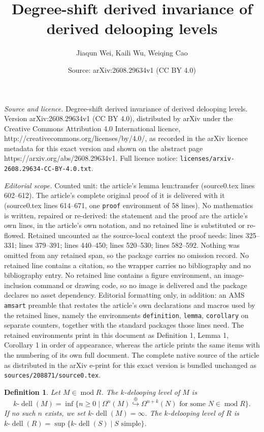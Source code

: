 \documentclass[10pt,a4paper]{amsart}
\title{Degree-shift derived invariance of derived delooping levels}
\author{Jiaqun Wei, Kaili Wu, Weiqing Cao}
\date{Source: arXiv:2608.29634v1 (CC BY 4.0)}
\newtheorem{definition}{Definition}
\DeclareMathOperator{\dell}{dell}
\DeclareMathOperator{\modd}{mod}
\newcommand{\oemb}{\stackrel{\oplus}{\hookrightarrow}}
\begin{document}
\maketitle

\noindent\emph{Source and licence.} Degree-shift derived invariance of derived delooping levels. Version arXiv:2608.29634v1 (CC BY 4.0), distributed by arXiv under the Creative Commons Attribution 4.0 International licence, http://creativecommons.org/licenses/by/4.0/, as recorded in the arXiv licence metadata for this exact version and shown on the abstract page https://arxiv.org/abs/2608.29634v1. Full licence notice: \texttt{licenses/arxiv-2608.29634-CC-BY-4.0.txt}.\par\smallskip

\noindent\textit{Editorial scope.} Counted unit: the article's lemma lem:transfer (source0.tex lines 602--612). The article's complete original proof of it is delivered with it (source0.tex lines 614--671, one \texttt{proof} environment of 58 lines). No mathematics is written, repaired or re-derived: the statement and the proof are the article's own lines, in the article's own notation, and no retained line is substituted or re-flowed.  Retained uncounted as the source-local context the proof needs: lines 325--331; lines 379--391; lines 440--450; lines 520--530; lines 582--592.  Nothing was omitted from any retained span, so the package carries no omission record.  No retained line contains a citation, so the wrapper carries no bibliography and no bibliography entry.  No retained line contains a figure environment, an image-inclusion command or drawing code, so no image is delivered and the package declares no asset dependency.  Editorial formatting only, in addition: an AMS \texttt{amsart} preamble that restates the article's own declarations and macros used by the retained lines, namely the environments \texttt{definition}, \texttt{lemma}, \texttt{corollary} on separate counters, together with the standard packages those lines need.  The retained environments print in this document as Definition 1, Lemma 1, Corollary 1 in order of appearance, whereas the article prints the same items with the numbering of its own full document.  The complete native source of the article as distributed in the arXiv e-print for this exact version is bundled unchanged as \texttt{sources/208871/source0.tex}.
\begin{definition}\label{def:k-dell}
Let $M \in \modd R$. The \emph{$k$-delooping level} of $M$ is
\[
k\text{-}\dell(M) = \inf\{n \geq 0 \mid \Omega^n(M)  \oemb  \Omega^{n+k}(N) \text{ for some } N \in \modd R\}.
\]
If no such $n$ exists, we set $k\text{-}\dell(M) = \infty$. The \emph{$k$-delooping level} of $R$ is $k\text{-}\dell(R) = \sup\{k\text{-}\dell(S) \mid S \text{ simple}\}$.
\end{definition}
\end{document}
